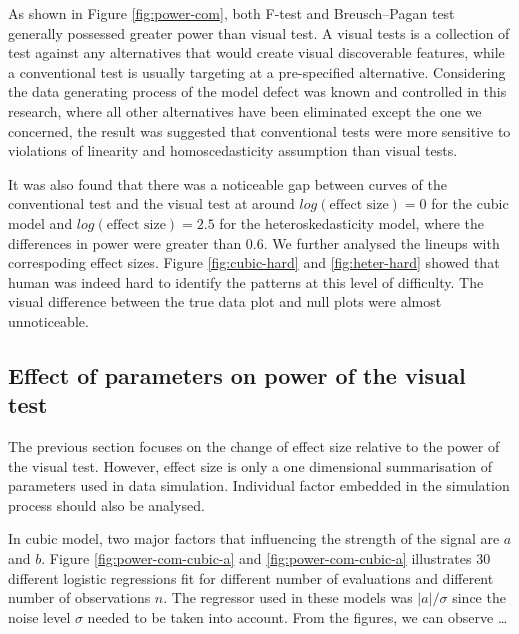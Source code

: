 \documentclass[]{interact}
\theoremstyle{plain}%
\theoremstyle{definition}
\theoremstyle{remark}
\begin{document}
As shown in Figure \ref{fig:power-com}, both F-test and Breusch--Pagan
test generally possessed greater power than visual test. A visual tests
is a collection of test against any alternatives that would create
visual discoverable features, while a conventional test is usually
targeting at a pre-specified alternative. Considering the data
generating process of the model defect was known and controlled in this
research, where all other alternatives have been eliminated except the
one we concerned, the result was suggested that conventional tests were
more sensitive to violations of linearity and homoscedasticity
assumption than visual tests.

It was also found that there was a noticeable gap between curves of the
conventional test and the visual test at around
\(log(\text{effect size}) = 0\) for the cubic model and
\(log(\text{effect size}) = 2.5\) for the heteroskedasticity model,
where the differences in power were greater than 0.6. We further
analysed the lineups with correspoding effect sizes. Figure
\ref{fig:cubic-hard} and \ref{fig:heter-hard} showed that human was
indeed hard to identify the patterns at this level of difficulty. The
visual difference between the true data plot and null plots were almost
unnoticeable.

\hypertarget{effect-of-parameters-on-power-of-the-visual-test}{%
\subsection{Effect of parameters on power of the visual
test}\label{effect-of-parameters-on-power-of-the-visual-test}}

The previous section focuses on the change of effect size relative to
the power of the visual test. However, effect size is only a one
dimensional summarisation of parameters used in data simulation.
Individual factor embedded in the simulation process should also be
analysed.

In cubic model, two major factors that influencing the strength of the
signal are \(a\) and \(b\). Figure \ref{fig:power-com-cubic-a} and
\ref{fig:power-com-cubic-a} illustrates 30 different logistic
regressions fit for different number of evaluations and different number
of observations \(n\). The regressor used in these models was
\(|a|/\sigma\) since the noise level \(\sigma\) needed to be taken into
account. From the figures, we can observe \ldots{}
\end{document}
